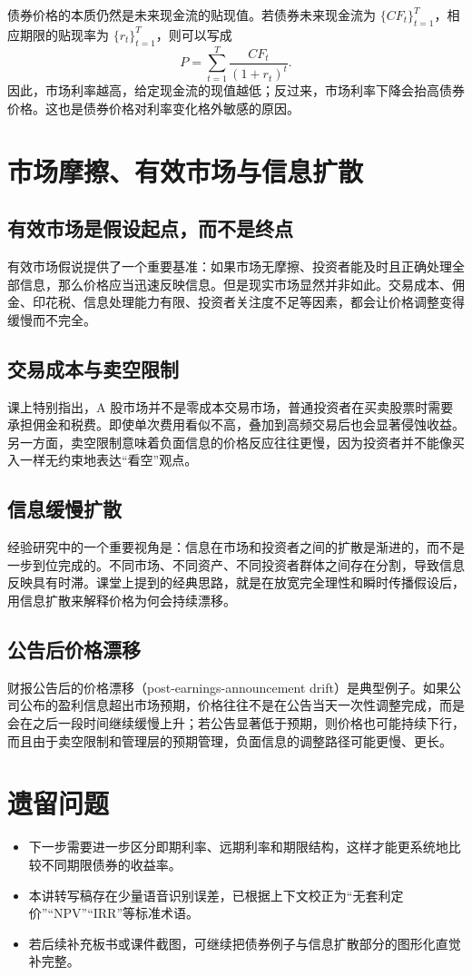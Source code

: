 \documentclass[UTF8,11pt,a4paper]{ctexart}
\begin{document}
债券价格的本质仍然是未来现金流的贴现值。若债券未来现金流为 $\{CF_t\}_{t=1}^{T}$，相应期限的贴现率为 $\{r_t\}_{t=1}^{T}$，则可以写成
\begin{equation}
  P = \sum_{t=1}^{T} \frac{CF_t}{(1+r_t)^t}.
\end{equation}
因此，市场利率越高，给定现金流的现值越低；反过来，市场利率下降会抬高债券价格。这也是债券价格对利率变化格外敏感的原因。

\section{市场摩擦、有效市场与信息扩散}

\subsection{有效市场是假设起点，而不是终点}

有效市场假说提供了一个重要基准：如果市场无摩擦、投资者能及时且正确处理全部信息，那么价格应当迅速反映信息。但是现实市场显然并非如此。交易成本、佣金、印花税、信息处理能力有限、投资者关注度不足等因素，都会让价格调整变得缓慢而不完全。

\subsection{交易成本与卖空限制}

课上特别指出，A 股市场并不是零成本交易市场，普通投资者在买卖股票时需要承担佣金和税费。即使单次费用看似不高，叠加到高频交易后也会显著侵蚀收益。另一方面，卖空限制意味着负面信息的价格反应往往更慢，因为投资者并不能像买入一样无约束地表达“看空”观点。

\subsection{信息缓慢扩散}

经验研究中的一个重要视角是：信息在市场和投资者之间的扩散是渐进的，而不是一步到位完成的。不同市场、不同资产、不同投资者群体之间存在分割，导致信息反映具有时滞。课堂上提到的经典思路，就是在放宽完全理性和瞬时传播假设后，用信息扩散来解释价格为何会持续漂移。

\subsection{公告后价格漂移}

财报公告后的价格漂移（post-earnings-announcement drift）是典型例子。如果公司公布的盈利信息超出市场预期，价格往往不是在公告当天一次性调整完成，而是会在之后一段时间继续缓慢上升；若公告显著低于预期，则价格也可能持续下行，而且由于卖空限制和管理层的预期管理，负面信息的调整路径可能更慢、更长。

\section{遗留问题}

\begin{itemize}
  \item 下一步需要进一步区分即期利率、远期利率和期限结构，这样才能更系统地比较不同期限债券的收益率。
  \item 本讲转写稿存在少量语音识别误差，已根据上下文校正为“无套利定价”“NPV”“IRR”等标准术语。
  \item 若后续补充板书或课件截图，可继续把债券例子与信息扩散部分的图形化直觉补完整。
\end{itemize}
\end{document}
